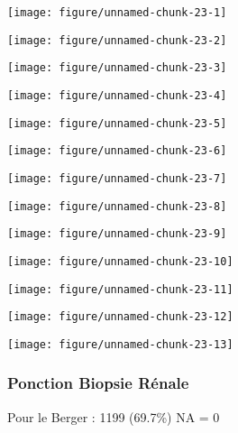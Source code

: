 \documentclass[11pt,a4paper]{article}\usepackage[]{graphicx}\usepackage[]{color}
\makeatletter
\def\maxwidth{ %
  \ifdim\Gin@nat@width>\linewidth
    \linewidth
  \else
    \Gin@nat@width
  \fi
}
\newenvironment{knitrout}{}{} %
\makeatother
\begin{document}
\begin{knitrout}
\color{fgcolor}
\texttt{[image: figure/unnamed-chunk-23-1]} 

\texttt{[image: figure/unnamed-chunk-23-2]} 

\texttt{[image: figure/unnamed-chunk-23-3]} 

\texttt{[image: figure/unnamed-chunk-23-4]} 

\texttt{[image: figure/unnamed-chunk-23-5]} 

\texttt{[image: figure/unnamed-chunk-23-6]} 

\texttt{[image: figure/unnamed-chunk-23-7]} 

\texttt{[image: figure/unnamed-chunk-23-8]} 

\texttt{[image: figure/unnamed-chunk-23-9]} 

\texttt{[image: figure/unnamed-chunk-23-10]} 

\texttt{[image: figure/unnamed-chunk-23-11]} 

\texttt{[image: figure/unnamed-chunk-23-12]} 

\texttt{[image: figure/unnamed-chunk-23-13]} 

\end{knitrout}

      \subsubsection{Ponction Biopsie Rénale}

Pour le Berger : 1199 (69.7\%) NA = 0
\end{document}
